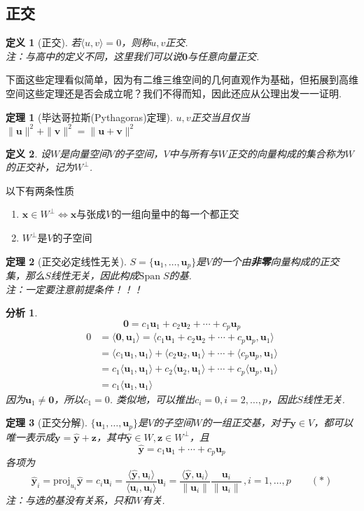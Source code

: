 \documentclass[11pt,UTF8]{ctexart}
\newtheorem{theorem}{定理}
\newtheorem{definition}{定义}
\newtheorem*{analysis}{分析}
\newcommand{\inp}[2]{\langle #1,#2 \rangle}
\newcommand{\vb}[1]{\mathbf{#1}}
\begin{document}
\subsection{正交}
\begin{definition}[正交]
若$\langle u,v\rangle=0$，则称$u,v$正交.\\
注：与高中的定义不同，这里我们可以说$\mathbf{0}$与任意向量正交.
\end{definition}
下面这些定理看似简单，因为有二维三维空间的几何直观作为基础，但拓展到高维空间这些定理还是否会成立呢？我们不得而知，因此还应从公理出发一一证明.
\begin{theorem}[毕达哥拉斯(Pythagoras)定理]
$u,v$正交当且仅当$\|\mathbf{u}\|^2+\|\mathbf{v}\|^2=\|\mathbf{u}+\mathbf{v}\|^2$
\end{theorem}
\begin{definition}
设$W$是向量空间$V$的子空间，$V$中与所有与$W$正交的向量构成的集合称为$W$的正交补，记为$W^\perp$.
\end{definition}
以下有两条性质
\begin{enumerate}
	\itemsep -3pt
	\item $\mathbf{x}\in W^\perp\iff\mathbf{x}$与张成$V$的一组向量中的每一个都正交
	\item $W^\perp$是$V$的子空间
\end{enumerate}
\begin{theorem}[正交必定线性无关]
\label{ortho_indep}
$S=\{\mathbf{u}_1,\dots,\mathbf{u}_p\}$是$V$的一个由\textbf{非零}向量构成的正交集，那么$S$线性无关，因此构成$\mathrm{Span}\;S$的基.\\
注：一定要注意前提条件！！！
\end{theorem}
\begin{analysis}
\[\vb{0}=c_1\vb{u}_1+c_2\vb{u}_2+\cdots+c_p\vb{u}_p\]
\[\begin{aligned}0&=\inp{\vb{0}}{\vb{u}_1}=\inp{c_1\vb{u}_1+c_2\vb{u}_2+\cdots+c_p\vb{u}_p}{\vb{u}_1}\\
&=\inp{c_1\vb{u}_1}{\vb{u}_1}+\inp{c_2\vb{u}_2}{\vb{u}_1}+\cdots+\inp{c_p\vb{u}_p}{\vb{u}_1}\\
&=c_1\inp{\vb{u}_1}{\vb{u}_1}+c_2\inp{\vb{u}_2}{\vb{u}_1}+\cdots+c_p\inp{\vb{u}_p}{\vb{u}_1}\\
&=c_1\inp{\vb{u}_1}{\vb{u}_1}
\end{aligned}\]
因为$\vb{u}_1\ne\vb{0}$，所以$c_1=0$. 类似地，可以推出$c_i=0,i=2,\dots,p$，因此$S$线性无关.
\end{analysis}
\begin{theorem}[正交分解]
$\{\mathbf{u}_1,\dots,\mathbf{u}_p\}$是$V$的子空间$W$的一组正交基，对于$\vb{y}\in V$，都可以唯一表示成$\vb{y}=\hat{\vb{y}}+\vb{z}$，其中$\hat{\vb{y}}\in W,\vb{z}\in W^\perp$，且
\[\hat{\mathbf{y}}=c_1\mathbf{u}_1+\cdots+c_p\mathbf{u}_p\]
各项为
\[\hat{\mathbf{y}}_i=\mathrm{proj}_{u_i}\hat{\mathbf{y}}=c_i\mathbf{u}_i=\frac{\langle \hat{\mathbf{y}},\mathbf{u}_i\rangle}{\langle\mathbf{u}_i,\mathbf{u}_i\rangle}\mathbf{u}_i=\frac{\langle \hat{\mathbf{y}},\mathbf{u}_i\rangle}{\|\mathbf{u}_i\|}\frac{\mathbf{u}_i}{\|\mathbf{u}_i\|}\,,i=1,\dots,p\qquad(*)\]
注：与选的基没有关系，只和$W$有关.
\end{theorem}
\end{document}
